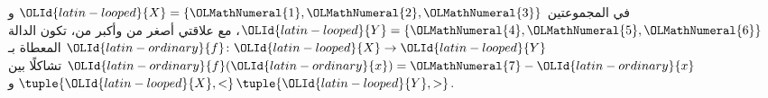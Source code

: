 \documentclass[../../../include/open-logic-section]{subfiles}
\begin{document}
\begin{ex}
في المجموعتين ${\OLId{latin-looped}{X}}=\{{\OLMathNumeral{1}},{\OLMathNumeral{2}},{\OLMathNumeral{3}}\}$ و${\OLId{latin-looped}{Y}}=\{{\OLMathNumeral{4}},{\OLMathNumeral{5}},{\OLMathNumeral{6}}\}$، مع علاقتي
أصغر من وأكبر من، تكون الدالة ${\OLId{latin-ordinary}{f}}\colon {\OLId{latin-looped}{X}} \to {\OLId{latin-looped}{Y}}$ المعطاة بـ
${\OLId{latin-ordinary}{f}}({\OLId{latin-ordinary}{x}}) = {\OLMathNumeral{7}}-{\OLId{latin-ordinary}{x}}$ تشاكلًا بين $\tuple{{\OLId{latin-looped}{X}},<}$ و$\tuple{{\OLId{latin-looped}{Y}},>}$.
\end{ex}
\end{document}
